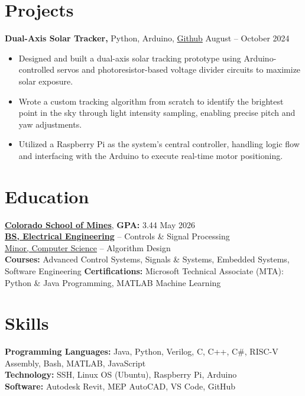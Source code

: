 \documentclass[11pt]{article}       %
\begin{document}
\vspace{-18pt}
\section*{Projects}
\vspace{5pt}

\textbf{Dual-Axis Solar Tracker, }{Python, Arduino, \href{https://github.com/edwardasilva/SolarPanelProject}{Github}} \hfill{August -- October 2024} \\
\vspace{-6.5pt}
\begin{itemize}
  \item Designed and built a dual-axis solar tracking prototype using Arduino-controlled servos and photoresistor-based voltage divider circuits to maximize solar exposure.
  \item Wrote a custom tracking algorithm from scratch to identify the brightest point in the sky through light intensity sampling, enabling precise pitch and yaw adjustments.
  \item Utilized a Raspberry Pi as the system's central controller, handling logic flow and interfacing with the Arduino to execute real-time motor positioning.
\end{itemize}


\vspace{-18 pt}
\section*{Education}
\vspace{5pt}

\textbf{\href{https://www.mines.edu/}{Colorado School of Mines}}, \textbf{GPA:} 3.44  \hfill May 2026\\
\textbf{\href{https://electrical.mines.edu/undergraduate-program/}{BS, Electrical Engineering}} -- Controls \& Signal Processing  \\
\href{https://cs.mines.edu/csmines-minors-and-areas-of-special-interest/}{Minor, Computer Science} -- Algorithm Design\\
\textbf{Courses:} Advanced Control Systems, Signals \& Systems, Embedded Systems, Software Engineering
\textbf{Certifications:} Microsoft Technical Associate (MTA): Python \& Java Programming, MATLAB Machine Learning

\section*{Skills}
\vspace{5pt}

\textbf{Programming Languages:} Java, Python, Verilog, C, C++, C\#, RISC-V Assembly, Bash, MATLAB, JavaScript \\
\textbf{Technology:} SSH, Linux OS (Ubuntu), Raspberry Pi, Arduino \\
\textbf{Software:} Autodesk Revit, MEP AutoCAD, VS Code, GitHub \\
\end{document}
